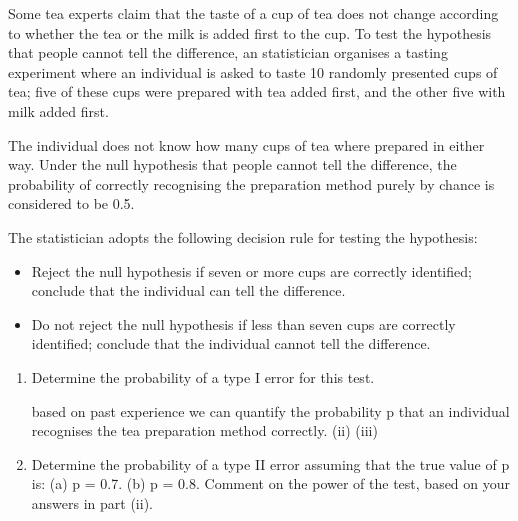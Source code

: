 \documentclass[a4paper,12pt]{article}
\begin{document}
\noindent Some tea experts claim that the taste of a cup of tea does not change according to
whether the tea or the milk is added first to the cup. To test the hypothesis that
people cannot tell the difference, an statistician organises a tasting experiment where an
individual is asked to taste 10 randomly presented cups of tea; five of these cups were
prepared with tea added first, and the other five with milk added first. 


The individual
does not know how many cups of tea where prepared in either way.
Under the null hypothesis that people cannot tell the difference, the probability of
correctly recognising the preparation method purely by chance is considered to be 0.5.

The statistician adopts the following decision rule for testing the hypothesis:
\begin{itemize}
\item Reject the null hypothesis if seven or more cups are correctly identified; conclude
that the individual can tell the difference.
\item Do not reject the null hypothesis if less than seven cups are correctly identified;
conclude that the individual cannot tell the difference.
\end{itemize}


\begin{enumerate}
\item %
Determine the probability of a type I error for this test.

based on past experience we can quantify the probability p that an individual
recognises the tea preparation method correctly.
(ii)
(iii)

\item Determine the probability of a type II error assuming that the true value of
p is:
(a) p = 0.7. 
(b) p = 0.8. 
Comment on the power of the test, based on your answers in part (ii).
\end{enumerate}



\newpage

\begin{table}[ht!]
 \centering
 \begin{tabular}{|p{15cm}|}
 \hline  
 
 \\ \hline
  \end{tabular}
\end{table}
\end{document}
